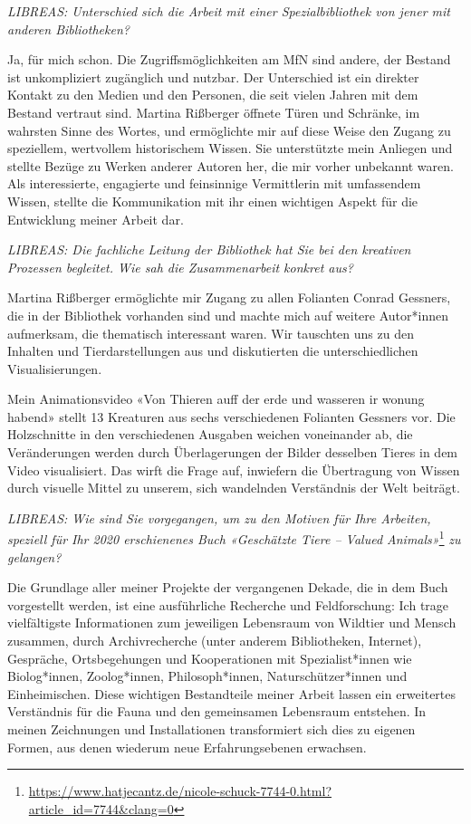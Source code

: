 \documentclass[a4paper,
fontsize=11pt,
oneside,
numbers=noperiodatend,
parskip=half-,
bibliography=totoc,
final
]{scrartcl}
\begin{document}
\emph{LIBREAS: Unterschied sich die Arbeit mit einer Spezialbibliothek
von jener mit anderen Bibliotheken?}

Ja, für mich schon. Die Zugriffsmöglichkeiten am MfN sind andere, der
Bestand ist unkompliziert zugänglich und nutzbar. Der Unterschied ist
ein direkter Kontakt zu den Medien und den Personen, die seit vielen
Jahren mit dem Bestand vertraut sind. Martina Rißberger öffnete Türen
und Schränke, im wahrsten Sinne des Wortes, und ermöglichte mir auf
diese Weise den Zugang zu speziellem, wertvollem historischem Wissen.
Sie unterstützte mein Anliegen und stellte Bezüge zu Werken anderer
Autoren her, die mir vorher unbekannt waren. Als interessierte,
engagierte und feinsinnige Vermittlerin mit umfassendem Wissen, stellte
die Kommunikation mit ihr einen wichtigen Aspekt für die Entwicklung
meiner Arbeit dar.

\emph{LIBREAS: Die fachliche Leitung der Bibliothek hat Sie bei den
kreativen Prozessen begleitet. Wie sah die Zusammenarbeit konkret aus?}

Martina Rißberger ermöglichte mir Zugang zu allen Folianten Conrad
Gessners, die in der Bibliothek vorhanden sind und machte mich auf
weitere Autor*innen aufmerksam, die thematisch interessant waren. Wir
tauschten uns zu den Inhalten und Tierdarstellungen aus und diskutierten
die unterschiedlichen Visualisierungen.

Mein Animationsvideo «Von Thieren auff der erde und wasseren ir wonung
habend» stellt 13 Kreaturen aus sechs verschiedenen Folianten Gessners
vor. Die Holzschnitte in den verschiedenen Ausgaben weichen voneinander
ab, die Veränderungen werden durch Überlagerungen der Bilder desselben
Tieres in dem Video visualisiert. Das wirft die Frage auf, inwiefern die
Übertragung von Wissen durch visuelle Mittel zu unserem, sich wandelnden
Verständnis der Welt beiträgt.

\emph{LIBREAS: Wie sind Sie vorgegangen, um zu den Motiven für Ihre
Arbeiten, speziell für Ihr 2020 erschienenes Buch «Geschätzte Tiere --
Valued Animals»}\footnote{\url{https://www.hatjecantz.de/nicole-schuck-7744-0.html?article_id=7744\&clang=0}}
\emph{zu gelangen?}

Die Grundlage aller meiner Projekte der vergangenen Dekade, die in dem
Buch vorgestellt werden, ist eine ausführliche Recherche und
Feldforschung: Ich trage vielfältigste Informationen zum jeweiligen
Lebensraum von Wildtier und Mensch zusammen, durch Archivrecherche
(unter anderem Bibliotheken, Internet), Gespräche, Ortsbegehungen und
Kooperationen mit Spezialist*innen wie Biolog*innen, Zoolog*innen,
Philosoph*innen, Naturschützer*innen und Einheimischen. Diese wichtigen
Bestandteile meiner Arbeit lassen ein erweitertes Verständnis für die
Fauna und den gemeinsamen Lebensraum entstehen. In meinen Zeichnungen
und Installationen transformiert sich dies zu eigenen Formen, aus denen
wiederum neue Erfahrungsebenen erwachsen.
\end{document}
